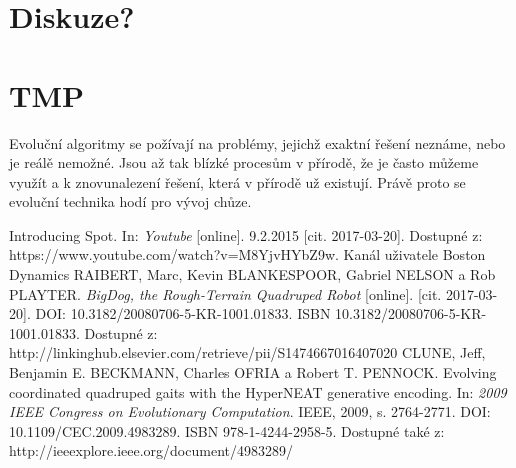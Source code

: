 \documentclass[a4]{article}
\begin{document}
\section{Diskuze?} 
\section{TMP}
Evoluční algoritmy se požívají na problémy, jejichž exaktní řešení neznáme, nebo je reálě nemožné. Jsou až tak blízké procesům v přírodě, že je často můžeme využít a k znovunalezení řešení, která v přírodě už existují. Právě proto se evoluční technika hodí pro vývoj chůze.
\begin{thebibliography}{3}
Introducing Spot. In: \textit{Youtube} [online]. 9.2.2015 [cit. 2017-03-20]. Dostupné z: https://www.youtube.com/watch?v=M8YjvHYbZ9w. Kanál uživatele Boston Dynamics
RAIBERT, Marc, Kevin BLANKESPOOR, Gabriel NELSON a Rob PLAYTER. \textit{BigDog, the Rough-Terrain Quadruped Robot} [online]. [cit. 2017-03-20]. DOI: 10.3182/20080706-5-KR-1001.01833. ISBN 10.3182/20080706-5-KR-1001.01833. Dostupné z: http://linkinghub.elsevier.com/retrieve/pii/S1474667016407020
CLUNE, Jeff, Benjamin E. BECKMANN, Charles OFRIA a Robert T. PENNOCK. Evolving coordinated quadruped gaits with the HyperNEAT generative encoding. In: \textit{2009 IEEE Congress on Evolutionary Computation}. IEEE, 2009, s. 2764-2771. DOI: 10.1109/CEC.2009.4983289. ISBN 978-1-4244-2958-5. Dostupné také z: http://ieeexplore.ieee.org/document/4983289/
\end{thebibliography}
\end{document}
